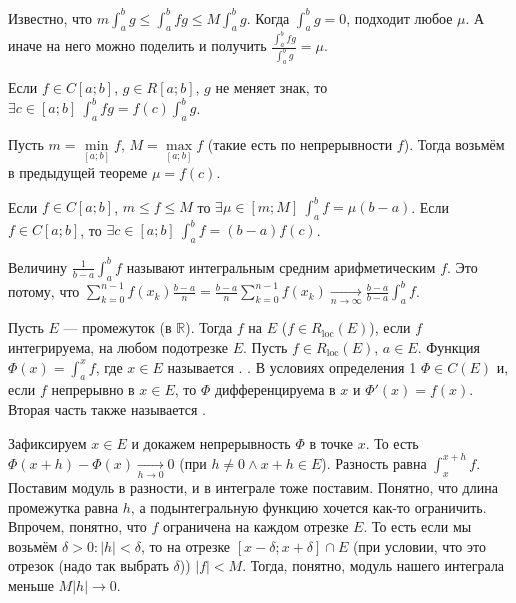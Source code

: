 \documentclass{article}
\begin{document}
\begin{itemize}
        \begin{Proof}
            Известно, что $m\int_a^bg\leqslant \int_a^bfg\leqslant M\int_a^bg$. Когда $\int_a^bg=0$, подходит любое $\mu$. А иначе на него можно поделить и получить $\frac{\int_a^bfg}{\int_a^bg}=\mu$.
        \end{Proof}
        \thm Если $f\in C[a;b]$, $g\in R[a;b]$, $g$ не меняет знак, то $\exists c\in[a;b]~\int_a^bfg=f(c)\int_a^bg$.
        \begin{Proof}
            Пусть $m=\min\limits_{[a;b]}f$, $M=\max\limits_{[a;b]}f$ (такие есть по непрерывности $f$). Тогда возьмём в предыдущей теореме $\mu=f(c)$.
        \end{Proof}
        \thm Если $f\in C[a;b]$, $m\leqslant f\leqslant M$ то $\exists \mu\in[m;M]~\int_a^bf=\mu(b-a)$.
        \thm Если $f\in C[a;b]$, то $\exists c\in[a;b]~\int_a^bf=(b-a)f(c)$.
        \begin{Comment}
            Величину $\frac1{b-a}\int_a^bf$ называют интегральным средним арифметическим $f$. Это потому, что $\sum\limits_{k=0}^{n-1}f(x_k)\frac{b-a}n=\frac{b-a}n\sum\limits_{k=0}^{n-1}f(x_k)\underset{n\to\infty}\longrightarrow\frac{b-a}{b-a}\int_a^bf$.
        \end{Comment}
        \dfn Пусть $E$ --- промежуток (в $\mathbb R$). Тогда $f$  на $E$ ($f\in R_{\mathrm{loc}}(E)$), если $f$ интегрируема, на любом подотрезке $E$.
        \dfn Пусть $f\in R_{\mathrm{loc}}(E)$, $a\in E$. Функция $\Phi(x)=\int_a^xf$, где $x\in E$ называется .
        \thm {}. В условиях определения 1 $\Phi\in C(E)$ и, если $f$ непрерывно в $x\in E$, то $\Phi$ дифференцируема в $x$ и $\Phi'(x)=f(x)$. Вторая часть также называется .
        \begin{Proof}
            Зафиксируем $x\in E$ и докажем непрерывность $\Phi$ в точке $x$. То есть $\Phi(x+h)-\Phi(x)\underset{h\to0}\longrightarrow0$ (при $h\neq0\land x+h\in E$). Разность равна $\int_x^{x+h}f$. Поставим модуль в разности, и в интеграле тоже поставим. Понятно, что длина промежутка равна $h$, а подынтегральную функцию хочется как-то ограничить. Впрочем, понятно, что $f$ ограничена на каждом отрезке $E$. То есть если мы возьмём $\delta>0:|h|<\delta$, то на отрезке $[x-\delta;x+\delta]\cap E$ (при условии, что это отрезок (надо так выбрать $\delta$)) $|f|<M$. Тогда, понятно, модуль нашего интеграла меньше $M|h|\longrightarrow0$.\\

\end{Proof}
\end{itemize}
\end{document}
